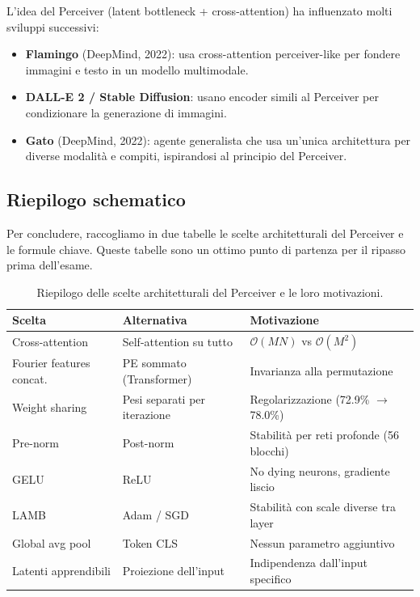 \documentclass[12pt,a4paper]{article}
\begin{document}
\begin{notabox}
L'idea del Perceiver (latent bottleneck + cross-attention) ha influenzato molti sviluppi successivi:
\begin{itemize}
    \item \textbf{Flamingo} (DeepMind, 2022): usa cross-attention perceiver-like per fondere immagini e testo in un modello multimodale.
    \item \textbf{DALL-E 2 / Stable Diffusion}: usano encoder simili al Perceiver per condizionare la generazione di immagini.
    \item \textbf{Gato} (DeepMind, 2022): agente generalista che usa un'unica architettura per diverse modalit\`a e compiti, ispirandosi al principio del Perceiver.
\end{itemize}
\end{notabox}

\subsection{Riepilogo schematico} \label{sec:riepilogo}

Per concludere, raccogliamo in due tabelle le scelte architetturali del Perceiver e le formule chiave. Queste tabelle sono un ottimo punto di partenza per il ripasso prima dell'esame.

\begin{table}[htbp]
\centering
\caption{Riepilogo delle scelte architetturali del Perceiver e le loro motivazioni.}
\begin{tabular}{@{}p{3.5cm}p{4cm}p{5cm}@{}}
\toprule
\textbf{Scelta} & \textbf{Alternativa} & \textbf{Motivazione} \\
\midrule
Cross-attention & Self-attention su tutto & $\mathcal{O}(MN)$ vs $\mathcal{O}(M^2)$ \\
Fourier features concat. & PE sommato (Transformer) & Invarianza alla permutazione \\
Weight sharing & Pesi separati per iterazione & Regolarizzazione (72.9\% $\to$ 78.0\%) \\
Pre-norm & Post-norm & Stabilit\`a per reti profonde (56 blocchi) \\
GELU & ReLU & No dying neurons, gradiente liscio \\
LAMB & Adam / SGD & Stabilit\`a con scale diverse tra layer \\
Global avg pool & Token CLS & Nessun parametro aggiuntivo \\
Latenti apprendibili & Proiezione dell'input & Indipendenza dall'input specifico \\
\bottomrule
\end{tabular}
\end{table}
\end{document}
